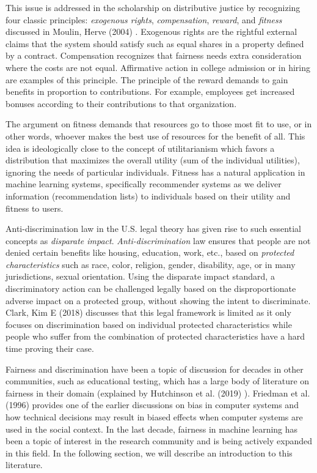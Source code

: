     This issue is addressed in the scholarship on distributive justice by recognizing four classic principles: \textit{exogenous rights}, \textit{compensation}, \textit{reward}, and  \textit{fitness} discussed in Moulin, Herve (2004) \cite{Moulin:FairDivision}. Exogenous rights are the rightful external claims that the system should satisfy such as equal shares in a property defined by a contract. Compensation recognizes that fairness needs extra consideration where the costs are not equal. Affirmative action in college admission or in hiring are examples of this principle. The principle of the reward demands to gain benefits in proportion to contributions. For example, employees get increased bonuses according to their contributions to that organization.
    
    The argument on fitness demands that resources go to those most fit to use, or in other words, whoever makes the best use of resources for the benefit of all. This idea is ideologically close to the concept of utilitarianism which favors a distribution that maximizes the overall utility (sum of the individual utilities), ignoring the needs of particular individuals. Fitness has a natural application in machine learning systems, specifically recommender systems as we deliver information (recommendation lists) to individuals based on their utility and fitness to users.
    
    Anti-discrimination law in the U.S. legal theory has given rise to such essential concepts as \textit{disparate impact}. \textit{Anti-discrimination} law ensures that people are not denied certain benefits like housing, education, work, etc., based on \textit{protected characteristics} such as race, color, religion, gender, disability, age, or in many jurisdictions, sexual orientation. Using the disparate impact standard, a discriminatory action can be challenged legally based on the disproportionate adverse impact on a protected group, without showing the intent to discriminate. Clark, Kim E (2018) \cite{clark2018demarginalizing} discusses that this legal framework is limited as it only focuses on discrimination based on individual protected characteristics while people who suffer from the combination of protected characteristics have a hard time proving their case.
    
    Fairness and discrimination have been a topic of discussion for decades in other communities, such as educational testing, which has a large body of literature on fairness in their domain (explained by Hutchinson et al. (2019) \cite{Hutchinson2019history}). Friedman et al. (1996) \cite{Friedman1996Bias} provides one of the earlier discussions on bias in computer systems and how technical decisions may result in biased effects when computer systems are used in the social context. In the last decade, fairness in machine learning has been a topic of interest in the research community and is being actively expanded in this field. In the following section, we will describe an introduction to this literature.

